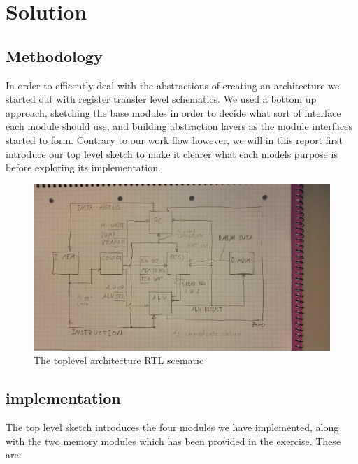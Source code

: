 \chapter{Solution}

\section{Methodology}

In order to efficently deal with the abstractions of creating an architecture we started out with register transfer level schematics. 
We used a bottom up approach, sketching the base modules in order to decide what sort of interface each module should use, and building abstraction layers as the module interfaces started to form.
Contrary to our work flow however, we will in this report first introduce our top level sketch to make it clearer what each models purpose is before exploring its implementation.

\begin{figure}[h!]
    \includegraphics[width=\linewidth]{img/toplevel.jpg}
    \caption{The toplevel architecture RTL scematic}
    \label{fig:toplevel}
\end{figure}

\section{implementation}
The top level sketch introduces the four modules we have implemented, along with the two memory modules which has been provided in the exercise. These are:

